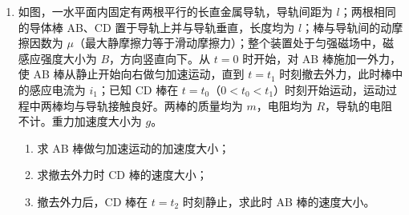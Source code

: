 \documentclass[\gkver]{gaokaozhenti}
\begin{document}
\begin{enumerate}
\onepicture[align=right, w=5.14cm]{}

\begin{enumerate}
	\item
	碰撞后瞬间物块 b 速度的大小；
	\item
	轻绳的长度。
\end{enumerate}


\item
如图，一水平面内固定有两根平行的长直金属导轨，导轨间距为 $l$；两根相同的导体棒 AB、CD 置于导轨上并与导轨垂直，长度均为 $l$；棒与导轨间的动摩擦因数为 $\mu$（最大静摩擦力等于滑动摩擦力）；整个装置处于匀强磁场中，磁感应强度大小为 $B$，方向竖直向下。从 $t=0$ 时开始，对 AB 棒施加一外力，使 AB 棒从静止开始向右做匀加速运动，直到 $t=t_1$ 时刻撤去外力，此时棒中的感应电流为 $i_1$；已知 CD 棒在 $t=t_0$（$0<t_0<t_1$）时刻开始运动，运动过程中两棒均与导轨接触良好。两棒的质量均为 $m$，电阻均为 $R$，导轨的电阻不计。重力加速度大小为 $g$。


\begin{enumerate}
	\item
	求 AB 棒做匀加速运动的加速度大小；
	\item
	求撤去外力时 CD 棒的速度大小；
	\item
	撤去外力后，CD 棒在 $t=t_2$ 时刻静止，求此时 AB 棒的速度大小。
\end{enumerate}


\end{enumerate}
\end{document}
